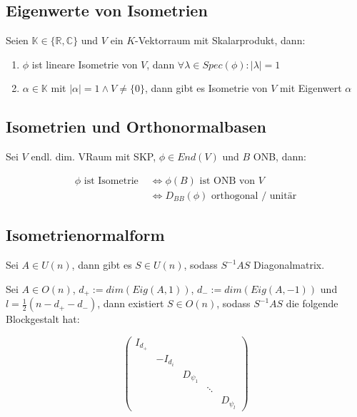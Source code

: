 \subsection*{Eigenwerte von Isometrien}

Seien $\mathbb{K} \in \{\mathbb{R}, \mathbb{C}\}$ und $V$ ein $K$-Vektorraum mit Skalarprodukt, dann:

\begin{enumerate}[label=(\alph*)]
	\item $\phi$ ist lineare Isometrie von $V$, dann $\forall \lambda \in Spec(\phi): |\lambda|=1$
	\item $\alpha \in \mathbb{K}$ mit $|\alpha|=1 \land V \neq \{0\}$, dann gibt es Isometrie von $V$ mit Eigenwert $\alpha$
\end{enumerate}

\subsection*{Isometrien und Orthonormalbasen}

Sei $V$ endl. dim. VRaum mit SKP, $\phi \in End(V)$ und $B$ ONB, dann:

\vspace*{-5mm}
\begin{align*}
	\phi \text{ ist Isometrie } &\Leftrightarrow \phi(B) \text{ ist ONB von } V \\
							    &\Leftrightarrow D_{BB}(\phi) \text{ orthogonal / unitär}
\end{align*}

\subsection*{Isometrienormalform}

Sei $A \in U(n)$, dann gibt es $S \in U(n)$, sodass $S^{-1} A S$ Diagonalmatrix.

Sei $A \in O(n)$, $d_+ := dim(Eig(A,1))$, $d_- := dim(Eig(A, -1))$ und $l = \frac{1}{2}(n - d_+ - d_-)$, dann existiert $S \in O(n)$, sodass $S^{-1} A S$ die folgende Blockgestalt hat:

$$\begin{pmatrix}
	I_{d_+} & & & & \\
	& -I_{d_i} & & & \\
	& & D_{\psi_1} & & \\
	& & & \ddots & \\
	& & & & D_{\psi_l}
\end{pmatrix}$$

